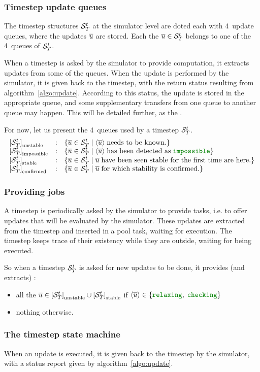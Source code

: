 \subsubsection{Timestep update queues}

The timestep structures ${{\cal S}}_{T}^{t}$ at the simulator level are doted each with 4~update queues, where the updates $\overline{u}$ are stored. Each the ${\overline{u}} \in {{{\cal S}}_{T}^{t}}$ belongs to one of the 4~queues of ${{\cal S}}_{T}^{t}$.

When a timestep is asked by the simulator to provide computation, it extracts updates from some of the queues. When the update is performed by the simulator, it is given back to the timestep, with the return status resulting from algorithm~\ref{algo:update}. According to this status, the update is stored in the appropriate queue, and some supplementary transfers from one queue to another queue may happen. This will be detailed further, as the .

For now, let us present the 4~queues used by a timestep ${{\cal S}}_{T}^{t}$.
\begin{equation}
  \cxQDefs \nonumber
\end{equation}


\subsubsection{Providing jobs \label{sec:providejobs}}

A timestep is periodically asked by the simulator to provide tasks, i.e. to offer updates that will be evaluated by the simulator. These updates are extracted from the timestep and inserted in a pool task, waiting for execution. The timestep keeps trace of their existency while they are outside, waiting for being executed.

So when a timestep ${{\cal S}}_{T}^{t}$ is asked for new updates to be done, it provides (and extracts) :
\begin{itemize}
\item all the ${\overline{u}} \in {{{\left[ {{\cal S}}_{T}^{t} \right]}_{\mathrm{unstable}}} \cup {{\left[ {{\cal S}}_{T}^{t} \right]}_{\mathrm{stable}}}}$ if $\cxJobsB$
\item nothing otherwise.
\end{itemize}



\subsubsection{The timestep state machine}

When an update is executed, it is given back to the timestep by the simulator, with a status report given by algorithm~\ref{algo:update}.

